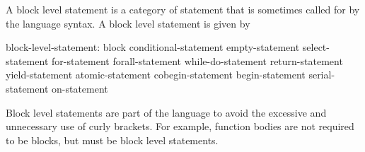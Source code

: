 A block level statement is a category of statement that is sometimes
called for by the language syntax. A block level statement is given by
\begin{syntax}
block-level-statement:
  block
  conditional-statement
  empty-statement
  select-statement
  for-statement
  forall-statement
  while-do-statement
  return-statement
  yield-statement
  atomic-statement
  cobegin-statement
  begin-statement
  serial-statement
  on-statement
\end{syntax}

Block level statements are part of the language to avoid the excessive
and unnecessary use of curly brackets.  For example, function bodies
are not required to be blocks, but must be block level statements.
